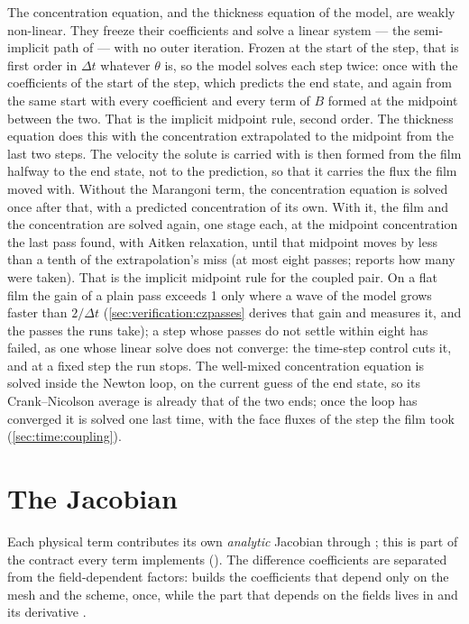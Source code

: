 The concentration equation, and the thickness equation of the  model,
are weakly non-linear. They freeze their coefficients and solve a linear
system --- the semi-implicit path of  ---
with no outer iteration. Frozen at the start of the step, that is first order
in $\Delta t$ whatever $\theta$ is, so the  model solves each step
twice: once with the coefficients of the start of the step, which predicts the
end state, and again from the same start with every coefficient and every term
of $B$ formed at the midpoint between the two. That is the implicit midpoint
rule, second order. The thickness equation does this with the concentration
extrapolated to the midpoint from the last two steps. The velocity the solute
is carried with is then formed from the film halfway to the end state, not to
the prediction, so that it carries the flux the film moved with. Without the
Marangoni term, the concentration equation is solved once after that, with a
predicted concentration of its own. With it, the film and the concentration
are solved again, one stage each, at the midpoint concentration the last pass
found, with Aitken relaxation, until that midpoint moves by less than a tenth
of the extrapolation's miss (at most eight passes;  reports
how many were taken). That is the implicit midpoint rule for the coupled
pair. On a flat film the gain of a plain pass exceeds 1 only where a wave of
the model grows faster than $2/\Delta t$ (\cref{sec:verification:czpasses}
derives that gain and measures it, and the passes the runs take); a step whose passes do not settle within eight has failed,
as one whose linear solve does not converge: the time-step control cuts it,
and at a fixed step the run stops. The
well-mixed concentration equation is solved inside the Newton loop, on the
current guess of the end state, so its Crank--Nicolson average is already that
of the two ends; once the loop has converged it is solved one last time, with
the face fluxes of the step the film took (\cref{sec:time:coupling}).

\section{The Jacobian}
\label{sec:time:jacobian}

Each physical term contributes its own \emph{analytic} Jacobian through
; this is part of the contract every term implements
(). The difference coefficients are separated from the
field-dependent factors:  builds the coefficients that
depend only on the mesh and the scheme, once, while the part that depends on
the fields lives in  and its derivative
.

